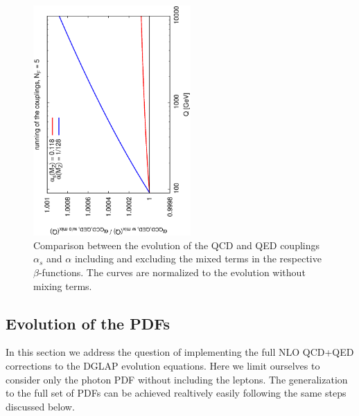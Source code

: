 \begin{widetext}
\begin{figure}[h]
\includegraphics[width=6cm,angle=270]{figs/couplings.eps} 
\caption{Comparison between the evolution of the QCD and QED couplings
  $\alpha_s$ and $\alpha$ including and excluding the mixed terms in
  the respective $\beta$-functions. The curves are normalized to the
  evolution without mixing terms.}
\label{fig:CouplingEvol}
\end{figure}

\subsection{Evolution of the PDFs}

In this section we address the question of implementing the full NLO
QCD+QED corrections to the DGLAP evolution equations. Here we limit
ourselves to consider only the photon PDF without including the
leptons. The generalization to the full set of PDFs can be achieved
realtively easily following the same steps discussed below.


\end{widetext}
